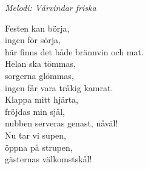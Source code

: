 {\footnotesize\textit{Melodi: Vårvindar friska}}\par
\vspace{10pt}
Festen kan börja,\\
ingen för sörja,\\
här finns det både brännvin och mat.\\
Helan ska tömmas,\\
sorgerna glömmas,\\
ingen får vara tråkig kamrat.\\
Klappa mitt hjärta,\\
fröjdas min själ,\\
nubben serveras genast, nåväl!\\
Nu tar vi supen,\\
öppna på strupen,\\
gästernas välkomstskål!
